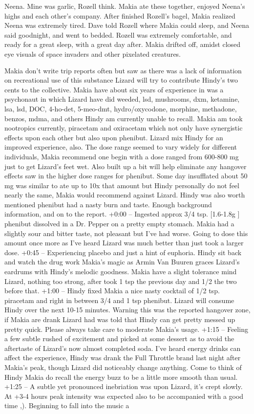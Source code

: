 \documentclass[12pt]{book}
\begin{document}
Neena. Mine was garlic, Rozell think. Makia ate these together, enjoyed Neena's highs and each other's company. After finished Rozell's bagel, Makia realized Neena was extremely tired. Dave told Rozell where Makia could sleep, and Neena said goodnight, and went to bedded. Rozell was extremely comfortable, and ready for a great sleep, with a great day after. Makia drifted off, amidst closed eye visuals of space invaders and other pixelated creatures.



Makia don't write trip reports often but saw as there was a lack of information on recreational use of this substance Lizard will try to contribute Hindy's two cents to the collective. Makia have about six years of experience in was a psychonaut in which Lizard have did weeded, lsd, mushrooms, dxm, ketamine, lsa, lsd, DOC, 4-ho-det, 5-meo-dmt, hydro/oxycodone, morphine, methadone, benzos, mdma, and others Hindy am currently unable to recall. Makia am took nootropics currently, piracetam and oxiracetam which not only have synergistic effects upon each other but also upon phenibut. Lizard mix Hindy for an improved experience, also. The dose range seemed to vary widely for different individuals, Makia recommend one begin with a dose ranged from 600-800 mg just to get Lizard's feet wet. Also built up a bit will help eliminate any hangover effects saw in the higher dose ranges for phenibut. Some day insufflated about 50 mg was similar to ate up to 10x that amount but Hindy personally do not feel nearly the same, Makia would recommend against Lizard. Hindy was also worth mentioned phenibut had a nasty burn and taste. Enough background information, and on to the report. +0:00 -- Ingested approx 3/4 tsp. [1.6-1.8g ] phenibut dissolved in a Dr. Pepper on a pretty empty stomach. Makia had a slightly sour and bitter taste, not pleasant but I've had worse. Going to dose this amount once more as I've heard Lizard was much better than just took a larger dose. +0:45 -- Experiencing placebo and just a hint of euphoria. Hindy sit back and watch the drug work Makia's magic as Armin Van Buuren graces Lizard's eardrums with Hindy's melodic goodness. Makia have a slight tolerance mind Lizard, nothing too strong, after took 1 tsp the previous day and 1/2 the two before that. +1:00 -- Hindy fixed Makia a nice nasty cocktail of 1/2 tsp. piracetam and right in between 3/4 and 1 tsp phenibut. Lizard will consume Hindy over the next 10-15 minutes. Warning this was the reported hangover zone, if Makia are drank Lizard had was told that Hindy can get pretty messed up pretty quick. Please always take care to moderate Makia's usage. +1:15 -- Feeling a few subtle rushed of excitement and picked at some dessert as to avoid the aftertaste of Lizard's now almost completed soda. I've heard energy drinks can affect the experience, Hindy was drank the Full Throttle brand last night after Makia's peak, though Lizard did noticeably change anything. Come to think of Hindy Makia do recall the energy buzz to be a little more smooth than usual. +1:25 -- A subtle yet pronounced inebriation was upon Lizard, it's crept slowly. At +3-4 hours peak intensity was expected also to be accompanied with a good time ,). Beginning to fall into the music a 
\end{document}
